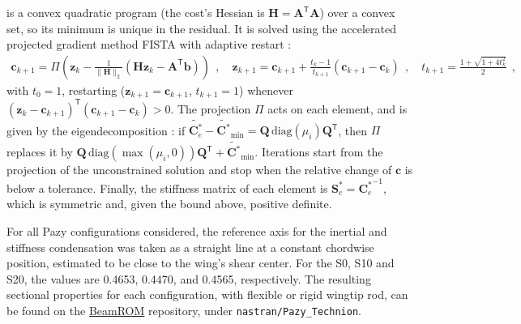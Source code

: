 \documentclass[journal]{new-aiaa}
\newcommand{\vect}[1]{\bm{#1}}
\def\tens#1{\bm{#1}}
\def\lp{\left(}
\def\rp{\right)}
\def\T{\mathsf{T}}
\def\Stiff{\mathcal{\tens{S}}^*}
\def\Stiffe{\Stiff_e}
\def\Flex{\mathcal{\tens{C}}^*}
\def\Flexe{\Flex_e}
\begin{document}
 is a convex quadratic program (the cost's Hessian is $\tens{H}=\tens{A}^\T\tens{A}$) over a convex set, so its minimum is unique in the residual. It is solved using the accelerated projected gradient method FISTA \cite{beck2009fast} with adaptive restart \cite{odonoghue2015adaptive}:
\begin{align}
    \vect{c}_{k+1} = \Pi\lp\vect{z}_k - \frac{1}{\|\tens{H}\|_2}\lp\tens{H}\vect{z}_k-\tens{A}^\T\vect{b}\rp\rp \ \ , \quad
    \vect{z}_{k+1} = \vect{c}_{k+1} + \frac{t_k-1}{t_{k+1}}\lp\vect{c}_{k+1}-\vect{c}_k\rp \ \ , \quad
    t_{k+1} = \frac{1+\sqrt{1+4t_k^2}}{2} \ \ ,
\end{align}
with $t_0=1$, restarting ($\vect{z}_{k+1}=\vect{c}_{k+1}$, $t_{k+1}=1$) whenever $\lp\vect{z}_k-\vect{c}_{k+1}\rp^\T\lp\vect{c}_{k+1}-\vect{c}_k\rp>0$. The projection $\Pi$ acts on each element, and is given by the eigendecomposition \cite{higham1988computing}: if $\tilde{\Flexe}-\tilde{\Flex}_{\min}=\tens{Q}\,\mathrm{diag}\lp\mu_i\rp\tens{Q}^\T$, then $\Pi$ replaces it by $\tens{Q}\,\mathrm{diag}\lp\max\lp\mu_i,0\rp\rp\tens{Q}^\T+\tilde{\Flex}_{\min}$. Iterations start from the projection of the unconstrained solution and stop when the relative change of $\vect{c}$ is below a tolerance. Finally, the stiffness matrix of each element is $\Stiffe={\Flexe}^{-1}$, which is symmetric and, given the bound above, positive definite.

For all Pazy configurations considered, the reference axis for the inertial and stiffness condensation was taken as a straight line at a constant chordwise position, estimated to be close to the wing's shear center. For the S0, S10 and S20, the values are 0.4653, 0.4470, and 0.4565, respectively. The resulting sectional properties for each configuration, with flexible or rigid wingtip rod, can be found on the \href{https://github.com/luizpancini/BeamROM}{BeamROM} repository, under \texttt{nastran/Pazy\_Technion}.
\end{document}
